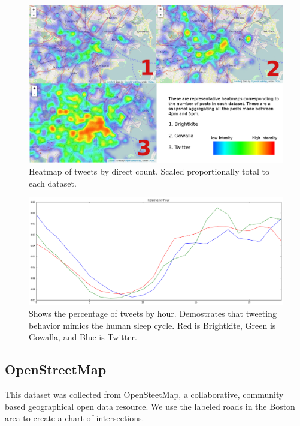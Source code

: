 \documentclass[twocolumn,10pt]{asme2ej}
\begin{document}
\begin{figure} 
\includegraphics[scale=0.23]{heatmap.png}
\caption{Heatmap of tweets by direct count. Scaled proportionally total to each dataset.}
\end{figure}
\begin{figure} 
\includegraphics[scale=0.2]{postsbyhour.png}
\caption{Shows the percentage of tweets by hour. Demostrates that tweeting behavior mimics the human sleep cycle. Red is Brightkite, Green is Gowalla, and Blue is Twitter.}
\end{figure}

\subsection{OpenStreetMap}

This dataset was collected from OpenSteetMap, a collaborative, community based geographical open data resource. We use the labeled roads in the Boston area to create a chart of intersections. 
\end{document}
